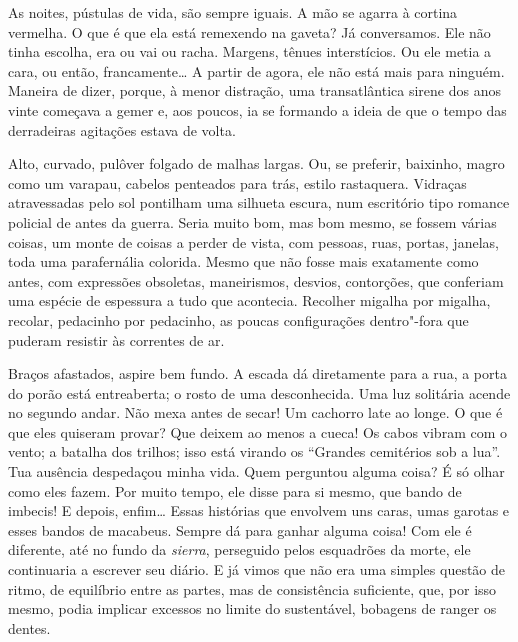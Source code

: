 \pagebreak
\thispagestyle{empty}
\movetooddpage
\thispagestyle{empty}
\begin{vplace}[0.25]


{\large{}}

\vspace{8cm}
{}
\end{vplace}



\pagebreak
\thispagestyle{empty}

\movetooddpage

As noites, pústulas de vida, são sempre iguais. A mão se agarra à
cortina vermelha. O que é que ela está remexendo na gaveta? Já
conversamos. Ele não tinha escolha, era ou vai ou racha. Margens, tênues
interstícios. Ou ele metia a cara, ou então, francamente\ldots{} A partir de
agora, ele não está mais para ninguém. Maneira de dizer, porque, à menor
distração, uma transatlântica sirene dos anos vinte começava a gemer e,
aos poucos, ia se formando a ideia de que o tempo das derradeiras
agitações estava de volta.

Alto, curvado, pulôver folgado de malhas largas. Ou, se preferir,
baixinho, magro como um varapau, cabelos penteados para trás, estilo
rastaquera. Vidraças atravessadas pelo sol pontilham uma silhueta
escura, num escritório tipo romance policial de antes da guerra. Seria
muito bom, mas bom mesmo, se fossem várias coisas, um monte de coisas a
perder de vista, com pessoas, ruas, portas, janelas, toda uma
parafernália colorida. Mesmo que não fosse mais exatamente como antes,
com expressões obsoletas, maneirismos, desvios, contorções, que
conferiam uma espécie de espessura a tudo que acontecia. Recolher
migalha por migalha, recolar, pedacinho por pedacinho, as poucas
configurações dentro"-fora que puderam resistir às correntes de ar.

Braços afastados, aspire bem fundo. A escada dá diretamente para a rua,
a porta do porão está entreaberta; o rosto de uma desconhecida. Uma luz
solitária acende no segundo andar. Não mexa antes de secar! Um cachorro
late ao longe. O que é que eles quiseram provar? Que deixem ao menos a
cueca! Os cabos vibram com o vento; a batalha dos trilhos; isso está
virando os ``Grandes cemitérios sob a lua''. Tua ausência despedaçou
minha vida. Quem perguntou alguma coisa? É só olhar como eles fazem. Por
muito tempo, ele disse para si mesmo, que bando de imbecis! E depois,
enfim\ldots{} Essas histórias que envolvem uns caras, umas garotas e esses
bandos de macabeus. Sempre dá para ganhar alguma coisa! Com ele é
diferente, até no fundo da \emph{sierra}, perseguido pelos esquadrões da
morte, ele continuaria a escrever seu diário. E já vimos que não era uma
simples questão de ritmo, de equilíbrio entre as partes, mas de
consistência suficiente, que, por isso mesmo, podia implicar excessos no
limite do sustentável, bobagens de ranger os dentes.

